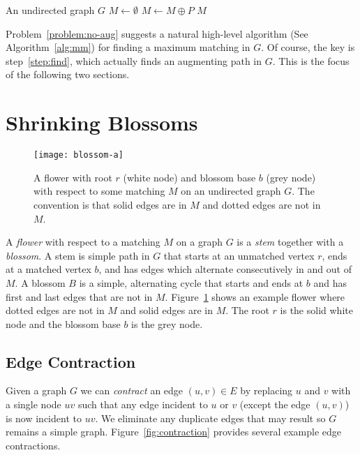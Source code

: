 \documentclass[11pt]{article}
\begin{document}
\begin{algorithm}[th!] 
\caption{$\mbox{\sc Maximum-Matching(G)}$} \label{alg:mm} 
\begin{algorithmic}[1] 
\REQUIRE An undirected graph $G$
\medskip 
\STATE $M \leftarrow \emptyset$
 \label{step:find}
\STATE $M \leftarrow M \oplus P$
\ENDWHILE
\RETURN $M$
\end{algorithmic}
\end{algorithm}

Problem~\ref{problem:no-aug} suggests a natural high-level algorithm (See Algorithm~\ref{alg:mm}) for finding a maximum matching in $G$.  Of course, the key is step~\ref{step:find}, which actually finds an augmenting path in $G$.   This is the focus of the following two sections.

\section{Shrinking Blossoms}

\begin{figure}[hbt]
\centering\texttt{[image: blossom-a]}
\caption{\label{fig:blossom} A flower with root $r$ (white node) and blossom base $b$ (grey node) with respect to some matching $M$ on an undirected graph $G$.  The convention is that solid edges are in $M$ and dotted edges are not in $M$.}
\end{figure}

A {\em flower} with respect to a matching $M$ on a graph $G$ is a {\em stem} together with a {\em blossom}.  A stem is simple path in $G$ that starts at an unmatched vertex $r$, ends at a matched vertex $b$, and has edges which alternate consecutively in and out of $M$.  A blossom $B$ is a simple, alternating cycle that starts and ends at $b$ and has first and last edges that are not in $M$.  Figure~\ref{fig:blossom} shows an example flower where dotted edges are not in $M$ and solid edges are in $M$.  The root $r$ is the solid white node and the blossom base $b$ is the grey node.

\subsection{Edge Contraction}

Given a graph $G$ we can {\em contract} an edge $(u,v) \in E$ by replacing $u$ and $v$ with a single node $uv$ such that any edge incident to $u$ or $v$ (except the edge $(u,v)$) is now incident to $uv$.  We eliminate any duplicate edges that may result so $G$ remains a simple graph.  Figure~\ref{fig:contraction} provides several example edge contractions.
\end{document}
